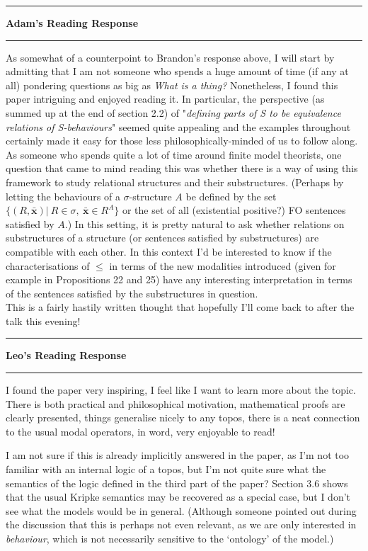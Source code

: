 \documentclass{amsart}
\newcommand{\iam}[1]{
  \vspace{0.25em}
  \hrule
  \vspace{0.25em}
  \textbf{{#1}'s Reading Response}
  \vspace{0.25em}
  \hrule
  \vspace{1em}
}
\begin{document}
\iam{Adam}
As somewhat of a counterpoint to Brandon's response above, I will start by admitting that I am not someone who spends a huge amount of time (if any at all) pondering questions as big as \textit{What is a thing?} Nonetheless, I found this paper intriguing and enjoyed reading it. In particular, the perspective (as summed up at the end of section 2.2) of "\textit{defining parts of S to be equivalence relations of S-behaviours}" seemed quite appealing and the examples throughout certainly made it easy for those less philosophically-minded of us to follow along. \\

As someone who spends quite a lot of time around finite model theorists, one question that came to mind reading this was whether there is a way of using this framework to study relational structures and their substructures. (Perhaps by letting the behaviours of a $\sigma$-structure $A$ be defined by the set $\{(R,\mathbf{\bar{x}}) | \ R \in \sigma, \ \mathbf{\bar{x}} \in R^{A} \}$ or the set of all (existential positive?) FO sentences satisfied by $A$.) In this setting, it is pretty natural to ask whether relations on substructures of a structure (or sentences satisfied by substructures) are compatible with each other. In this context I'd be interested to know if the characterisations of $\leq$ in terms of the new modalities introduced (given for example in Propositions 22 and 25) have any interesting interpretation in terms of the sentences satisfied by the substructures in question. \\

This is a fairly hastily written thought that hopefully I'll come back to after the talk this evening! \\

\iam{Leo}
I found the paper very inspiring, I feel like I want to learn more about the topic. There is both practical and philosophical motivation, mathematical proofs are clearly presented, things generalise nicely to any topos, there is a neat connection to the usual modal operators, in word, very enjoyable to read!

I am not sure if this is already implicitly answered in the paper, as I'm not too familiar with an internal logic of a topos, but I'm not quite sure what the semantics of the logic defined in the third part of the paper? Section 3.6 shows that the usual Kripke semantics may be recovered as a special case, but I don't see what the models would be in general. (Although someone pointed out during the discussion that this is perhaps not even relevant, as we are only interested in {\em behaviour}, which is not necessarily sensitive to the `ontology' of the model.)
\end{document}
